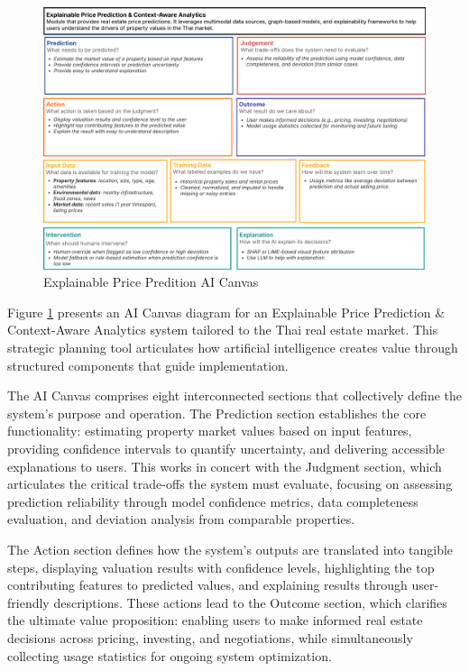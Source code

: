 \begin{figure}[htbp]
	\centering
	\includegraphics[width=1\textwidth]{assets/ai/ai-canvas.png}
	\caption{Explainable Price Predition AI Canvas}
	\label{fig:ai-canvas-2}
\end{figure}

\noindent Figure \ref{fig:ai-canvas-2} presents an AI Canvas diagram for an Explainable Price Prediction \& Context-Aware Analytics system tailored to the Thai real estate market. This strategic planning tool articulates how artificial intelligence creates value through structured components that guide implementation.

The AI Canvas comprises eight interconnected sections that collectively define the system's purpose and operation. The Prediction section establishes the core functionality: estimating property market values based on input features, providing confidence intervals to quantify uncertainty, and delivering accessible explanations to users. This works in concert with the Judgment section, which articulates the critical trade-offs the system must evaluate, focusing on assessing prediction reliability through model confidence metrics, data completeness evaluation, and deviation analysis from comparable properties.

The Action section defines how the system's outputs are translated into tangible steps, displaying valuation results with confidence levels, highlighting the top contributing features to predicted values, and explaining results through user-friendly descriptions. These actions lead to the Outcome section, which clarifies the ultimate value proposition: enabling users to make informed real estate decisions across pricing, investing, and negotiations, while simultaneously collecting usage statistics for ongoing system optimization.

